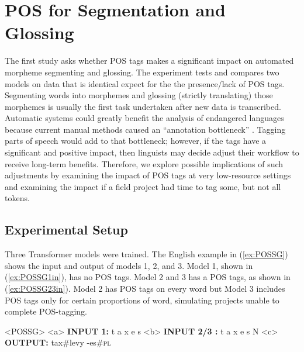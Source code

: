 \section{POS for Segmentation and Glossing}
\label{sec:seggls}

The first study asks whether POS tags makes a significant impact on automated morpheme segmenting and glossing. The experiment tests and compares two models on data that is identical expect for the the presence/lack of POS tags. Segmenting words into morphemes and glossing (strictly translating) those morphemes is usually the first task undertaken after new data is transcribed. Automatic systems could greatly benefit the analysis of endangered languages because current manual methods caused an ``annotation bottleneck'' \citep{simons_worlds_2013,holton_developing_2017,seifart_language_2018}. Tagging parts of speech would add to that bottleneck; however, if the tags have a significant and positive impact, then linguists may decide adjust their workflow to receive long-term benefits. Therefore, we explore possible implications of such adjustments by examining the impact of POS tags at very low-resource settings and examining the impact if a field project had time to tag some, but not all tokens. 

\subsection{Experimental Setup}
\label{sec:segglssetup}

Three Transformer models were trained. The English example in (\ref{ex:POSSG}) shows the input and output of models 1, 2, and 3. Model 1, shown in (\ref{ex:POSSG1in}), has no POS tags. Model 2 and 3 has a POS tags, as shown in (\ref{ex:POSSG23in}). Model 2 has POS tags on every word but Model 3 includes POS tags only for certain proportions of word, simulating projects unable to complete POS-tagging.

\pex<POSSG>   
\label{ex:POSSG}
\a<a> \textbf{INPUT 1:} \hspace{2 mm} t \hspace{2 mm} a \hspace{2 mm} x \hspace{2 mm} e \hspace{2 mm} s 
\label{ex:POSSG1in}
\a<b> \textbf{INPUT 2/3 :} \hspace{2 mm} t \hspace{2 mm} a \hspace{2 mm} x \hspace{2 mm} e \hspace{2 mm} s \hspace{2 mm} N
\label{ex:POSSG23in}
\a<c> \textbf{OUTPUT:} \hspace{2 mm} tax\#levy \hspace{2mm} -es\#\textsc{pl}
\label{ex:POSSGout}
\xe

